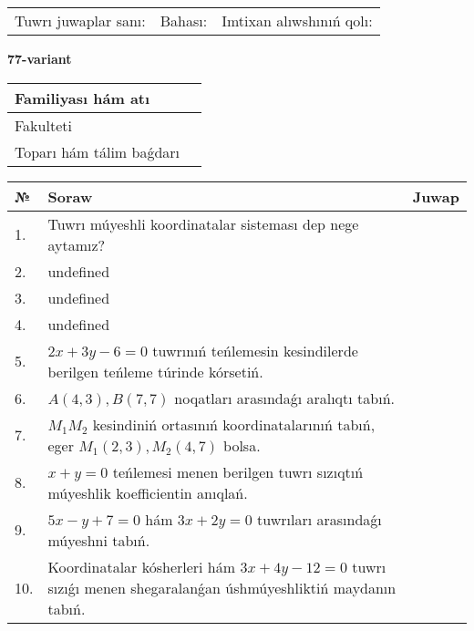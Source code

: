 \documentclass{article}
\begin{document}
\vspace{0.7cm}

\begin{tabular}{lll}
Tuwrı juwaplar sanı: \underline{\hspace{1cm}} & 
Bahası: \underline{\hspace{1cm}} & 
Imtixan alıwshınıń qolı: \underline{\hspace{2cm}} \\
\end{tabular}

\egroup

\newpage


\textbf{77-variant}\\

\bgroup
\def\arraystretch{1.6} %

\begin{tabular}{|m{5.7cm}|m{9.5cm}|}
\hline
Familiyası hám atı & \\
\hline
Fakulteti  & \\
\hline
Toparı hám tálim baǵdarı  & \\
\hline
\end{tabular}

\vspace{0.7cm}

\begin{tabular}{|m{0.7cm}|m{10cm}|m{4cm}|}
\hline
№ & Soraw & Juwap \\
\hline
1. & Tuwrı múyeshli koordinatalar sisteması dep nege aytamız? &  \\
\hline
2. & undefined &  \\
\hline
3. & undefined &  \\
\hline
4. & undefined &  \\
\hline
5. & \(2 x + 3 y - 6 = 0\) tuwrınıń teńlemesin kesindilerde berilgen teńleme túrinde kórsetiń. &  \\
\hline
6. & \(A (4, 3), B (7, 7)\) noqatları arasındaǵı aralıqtı tabıń. &  \\
\hline
7. & \(M_{1}M_{2}\) kesindiniń ortasınıń koordinatalarınıń tabıń, eger \(M_{1} (2, 3), M_{2} (4, 7)\) bolsa. &  \\
\hline
8. & \(x + y = 0\) teńlemesi menen berilgen tuwrı sızıqtıń múyeshlik koefficientin anıqlań. &  \\
\hline
9. & \(5 x - y + 7 = 0\) hám \(3 x + 2 y = 0\) tuwrıları arasındaǵı múyeshni tabıń. &  \\
\hline
10. & Koordinatalar kósherleri hám \( 3 x + 4 y - 12 = 0 \) tuwrı sızıǵı menen shegaralanǵan úshmúyeshliktiń maydanın tabıń. & \\
\hline
\end{tabular}
\end{document}
